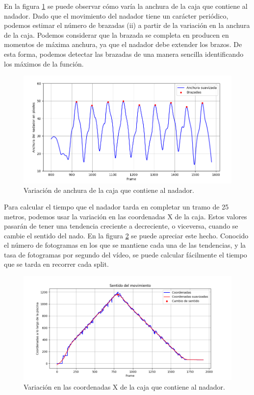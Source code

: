En la figura \ref{fig:primerejemplovariacionanchura} se puede observar cómo varía la anchura de la caja que contiene al nadador. Dado que el movimiento del nadador tiene un carácter periódico, podemos estimar el número de brazadas (ii) a partir de la variación en la anchura de la caja. Podemos considerar que la brazada se completa en producen en momentos de máxima anchura, ya que el nadador debe extender los brazos. De esta forma, podemos detectar las brazadas de una manera sencilla identificando los máximos de la función.

\begin{figure}[h!]
    \centering
    \includegraphics[width=\textwidth,height=\textheight,keepaspectratio]{imagenes/capitulo2/ejemplo_variacion_altura.png}
    \caption{Variación de anchura de la caja que contiene al nadador.}
    \label{fig:primerejemplovariacionanchura}
\end{figure}

Para calcular el tiempo que el nadador tarda en completar un tramo de 25 metros, podemos usar la variación en las coordenadas X de la caja. Estos valores pasarán de tener una tendencia creciente a decreciente, o viceversa, cuando se cambie el sentido del nado. En la figura \ref{fig:primerejemplovariacionsentido} se puede apreciar este hecho. Conocido el número de fotogramas en los que se mantiene cada una de las tendencias, y la tasa de fotogramas por segundo del vídeo, se puede calcular fácilmente el tiempo que se tarda en recorrer cada split.

\begin{figure}[h!]
    \centering
    \includegraphics[width=\textwidth,height=\textheight,keepaspectratio]{imagenes/capitulo2/ejemplo_cambio_sentido.png}
    \caption{Variación en las coordenadas X de la caja que contiene al nadador.}
    \label{fig:primerejemplovariacionsentido}
\end{figure}

